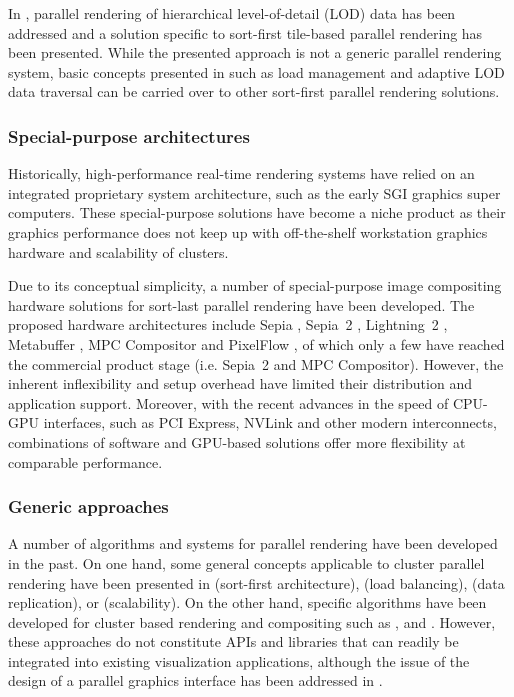 In \cite{NC:07}, parallel rendering of hierarchical level-of-detail (LOD) data
has been addressed and a solution specific to sort-first tile-based parallel
rendering has been presented. While the presented approach is not a generic
parallel rendering system, basic concepts presented in \cite{NC:07} such as load
management and adaptive LOD data traversal can be carried over to other
sort-first parallel rendering solutions.

\subsubsection{Special-purpose architectures}

Historically, high-performance real-time rendering systems have relied on an
integrated proprietary system architecture, such as the early SGI graphics super
computers. These special-purpose solutions have become a niche product as their
graphics performance does not keep up with off-the-shelf workstation graphics
hardware and scalability of clusters.

Due to its conceptual simplicity, a number of special-purpose image compositing
hardware solutions for sort-last parallel rendering have been developed. The
proposed hardware architectures include Sepia \cite {MHS:99a,sepia}, Sepia~2
\cite{LMSBHa:01,LMSBH:01}, Lightning~2 \cite{Stoll01}, Metabuffer
\cite{Blanke00,Zhang01}, MPC Compositor \cite{Muraki01} and PixelFlow
\cite{Molnar92, Eyles97}, of which only a few have reached the commercial
product stage (i.e. Sepia~2 and MPC Compositor). However, the inherent
inflexibility and setup overhead have limited their distribution and application
support. Moreover, with the recent advances in the speed of CPU-GPU interfaces,
such as PCI Express, NVLink and other modern interconnects, combinations of
software and GPU-based solutions offer more flexibility at comparable
performance.

\subsubsection{Generic approaches}

A number of algorithms and systems for parallel rendering have been developed in
the past. On one hand, some general concepts applicable to cluster parallel
rendering have been presented in \cite{Mueller:95,Mueller:97} (sort-first
architecture), \cite{SZFLS:99,SFLS:00} (load balancing), \cite{SFL:01} (data
replication), or \cite{CMF:05,CM:06} (scalability). On the other hand, specific
algorithms have been developed for cluster based rendering and compositing such
as \cite{AP:98}, \cite{CKS:02} and \cite{YYC:01,SMLAP:03}. However, these
approaches do not constitute APIs and libraries that can readily be integrated
into existing visualization applications, although the issue of the design of a
parallel graphics interface has been addressed in \cite{Igehy98}.

